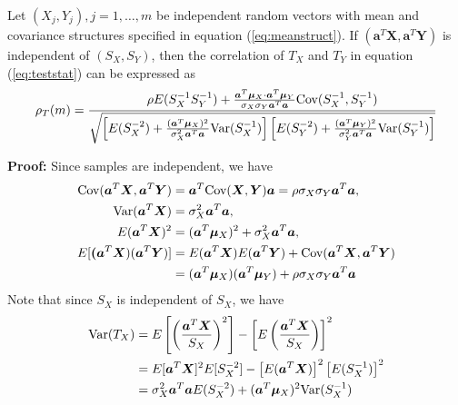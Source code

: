 	\begin{theorem}\label{thm:teststatcor}
		Let $(X_j, Y_j), j = 1, \ldots, m$ be independent random vectors with mean and covariance 
		structures specified in equation (\ref{eq:meanstruct}). If $(\bm a^T\bm X, \bm a^T\bm Y)$ 
		is independent of $(S_X, S_Y)$, then the correlation of $T_X$ and $T_Y$ in equation 
		(\ref{eq:teststat}) can be expressed as 
		\begin{equation}\label{eq:teststatcor}
		\rho_T(m) = \frac{ \rho E(S_X^{-1}S_Y^{-1}) + \frac{\bm a^T\bm \mu_X\cdot \bm a^T\bm 
				\mu_Y}{\sigma_X\sigma_Y\bm a^T\bm a}\text{Cov}(S_X^{-1}, S_Y^{-1}) 
				}{\sqrt{\left[E(S_X^{-2}) 
				+ \frac{(\bm a^T\bm \mu_X)^2}{\sigma_X^2\bm a^T\bm 
					a}\text{Var}(S_X^{-1})\right]\left[E(S_Y^{-2}) + \frac{(\bm a^T\bm 
					\mu_Y)^2}{\sigma_Y^2\bm 
					a^T\bm a}\text{Var}(S_Y^{-1})\right]}}
		\end{equation}
	\end{theorem}
	\textbf{Proof:} Since samples are independent, we have 
	\begin{equation}\label{eq:testprepare}
	\begin{aligned}
	\text{Cov}(\bm a^T\bm X, \bm a^T\bm Y) &= \bm a^T \text{Cov}(\bm X, \bm Y)\bm a  = \rho\sigma_X\sigma_Y\bm 
	a^T\bm a, \\
	\text{Var}(\bm a^T\bm X)&  = \sigma_X^2\bm a^T\bm a, \\
	E(\bm a^T\bm X)^2& =(\bm a^T\bm \mu_X)^2 + \sigma_X^2\bm a^T\bm a, \\
	E[\bm (\bm a^T\bm X)(\bm a^T\bm Y)] &=E(\bm a^T\bm X)E(\bm a^T\bm Y) + \text{Cov}(\bm a^T\bm X, \bm 
	a^T\bm Y)  	\\& = (\bm a^T\bm \mu_X)(\bm a^T\bm \mu_Y) + \rho \sigma_X\sigma_Y\bm a^T\bm a
	\end{aligned}
	\end{equation}
	Note that since $S_X$ is independent of $S_X$, we have 
	\begin{equation}\label{eq:testdenom1}
	\begin{aligned}
	\text{Var}(T_X) &= E\left[\left(\frac{\bm a^T\bm X}{S_X}\right)^2\right] - \left[E\left(\frac{\bm 
	a^T\bm X}{S_X}\right)\right]^2\\
	& = E[\bm a^T\bm X]^2E[S_X^{-2}] - \left[E(\bm a^T\bm X)\right]^2\left[E(S_X^{-1})\right]^2\\
	& = \sigma_X^2\bm a^T\bm a E(S_X^{-2}) + (\bm a^T\bm \mu_X)^2\text{Var}(S_X^{-1})
	\end{aligned}
	\end{equation}
